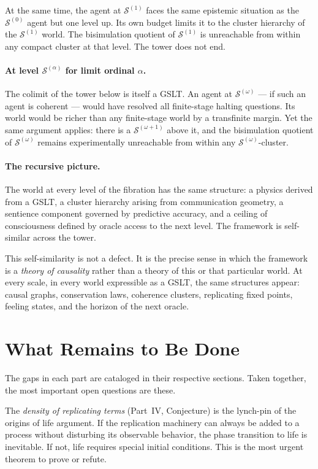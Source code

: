 \documentclass[12pt]{article}
\theoremstyle{remark}
\newcommand{\GSLT}{\mathcal{S}}
\newcommand{\fiber}[1]{\GSLT^{(#1)}}
\begin{document}
At the same time, the agent at $\fiber{1}$ faces the same
epistemic situation as the $\fiber{0}$ agent but one level up.
Its own budget limits it to the cluster hierarchy of the
$\fiber{1}$ world.
The bisimulation quotient of $\fiber{1}$ is unreachable from
within any compact cluster at that level.
The tower does not end.

\paragraph{At level $\fiber{\alpha}$ for limit ordinal $\alpha$.}
The colimit of the tower below is itself a GSLT.
An agent at $\fiber{\omega}$ --- if such an agent is coherent ---
would have resolved all finite-stage halting questions.
Its world would be richer than any finite-stage world by a
transfinite margin.
Yet the same argument applies: there is a $\fiber{\omega+1}$
above it, and the bisimulation quotient of $\fiber{\omega}$
remains experimentally unreachable from within any
$\fiber{\omega}$-cluster.

\paragraph{The recursive picture.}
The world at every level of the fibration has the same structure:
a physics derived from a GSLT, a cluster hierarchy arising from
communication geometry, a sentience component governed by
predictive accuracy, and a ceiling of consciousness defined by
oracle access to the next level.
The framework is self-similar across the tower.

This self-similarity is not a defect.
It is the precise sense in which the framework is a \emph{theory
of causality} rather than a theory of this or that particular
world.
At every scale, in every world expressible as a GSLT, the same
structures appear: causal graphs, conservation laws, coherence
clusters, replicating fixed points, feeling states, and the
horizon of the next oracle.

\section*{What Remains to Be Done}

The gaps in each part are cataloged in their respective sections.
Taken together, the most important open questions are these.

The \emph{density of replicating terms} (Part~IV, Conjecture) is
the lynch-pin of the origins of life argument.
If the replication machinery can always be added to a process
without disturbing its observable behavior, the phase transition
to life is inevitable.
If not, life requires special initial conditions.
This is the most urgent theorem to prove or refute.
\end{document}
